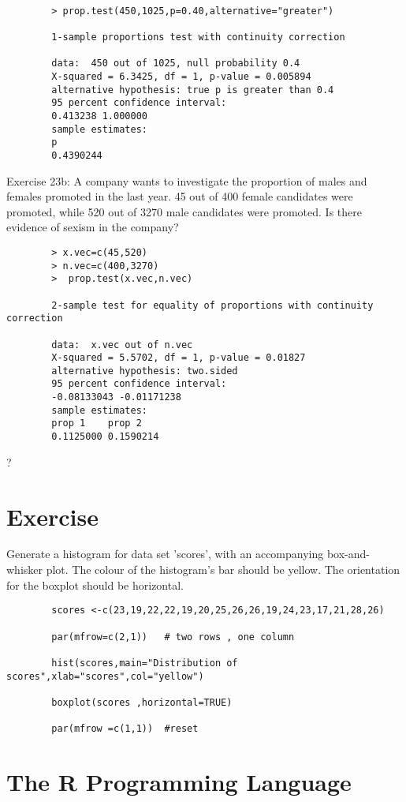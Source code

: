 \documentclass[a4paper,12pt]{article}
\begin{document}
\begin{itemize}
		\begin{verbatim}
		
		> prop.test(450,1025,p=0.40,alternative="greater")
		
		1-sample proportions test with continuity correction
		
		data:  450 out of 1025, null probability 0.4
		X-squared = 6.3425, df = 1, p-value = 0.005894
		alternative hypothesis: true p is greater than 0.4
		95 percent confidence interval:
		0.413238 1.000000
		sample estimates:
		p
		0.4390244
		\end{verbatim}
		
		Exercise 23b:  A company wants to investigate the proportion of males and females promoted in the last year. 45 out of 400 female candidates were promoted, while 520 out of 3270 male candidates were promoted. Is there evidence of sexism in the company?
		\begin{verbatim}
		> x.vec=c(45,520)
		> n.vec=c(400,3270)
		>  prop.test(x.vec,n.vec)
		
		2-sample test for equality of proportions with continuity correction
		
		data:  x.vec out of n.vec
		X-squared = 5.5702, df = 1, p-value = 0.01827
		alternative hypothesis: two.sided
		95 percent confidence interval:
		-0.08133043 -0.01171238
		sample estimates:
		prop 1    prop 2
		0.1125000 0.1590214
		\end{verbatim}
		
		?
		\section{Exercise}
		
		Generate a histogram for data set 'scores', with an accompanying box-and-whisker plot.
		The colour of the histogram's bar should be yellow. The orientation for the boxplot should be horizontal.
		
		\begin{verbatim}
		scores <-c(23,19,22,22,19,20,25,26,26,19,24,23,17,21,28,26)
		
		par(mfrow=c(2,1)) 	# two rows , one column
		
		hist(scores,main="Distribution of scores",xlab="scores",col="yellow")
		
		boxplot(scores ,horizontal=TRUE)
		
		par(mfrow =c(1,1)) 	#reset
		\end{verbatim}
		\section{The R Programming Language}
		

\end{itemize}
\end{document}
